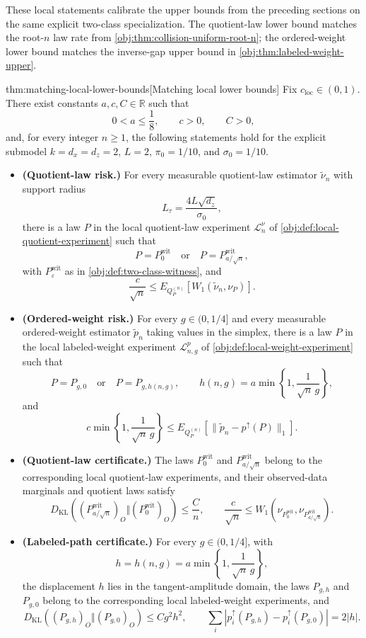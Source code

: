 \documentclass[11pt]{article}
\begin{document}
These local statements calibrate the upper bounds from the preceding sections on the same explicit two-class specialization. The quotient-law lower bound matches the root-\(n\) law rate from \cref{obj:thm:collision-uniform-root-n}; the ordered-weight lower bound matches the inverse-gap upper bound in \cref{obj:thm:labeled-weight-upper}.

\begin{theoremv}{thm:matching-local-lower-bounds}[Matching local lower bounds]
Fix \(c_{\mathrm{loc}}\in(0,1)\). There exist constants \(a,c,C\in\mathbb R\) such that
\[
0<a\le \frac18,\qquad c>0,\qquad C>0,
\]
and, for every integer \(n\ge 1\), the following statements hold for the explicit submodel \(k=d_x=d_z=2\), \(L=2\), \(\pi_0=1/10\), and \(\sigma_0=1/10\).
\begin{itemize}
\item \textbf{(Quotient-law risk.)} For every measurable quotient-law estimator \(\widetilde\nu_n\) with support radius
\[
L_\tau=\frac{4L\sqrt{d_z}}{\sigma_0},
\]
there is a law \(P\) in the local quotient-law experiment \(\mathcal L_n^\nu\) of \cref{obj:def:local-quotient-experiment} such that
\[
P=P_0^{\mathrm{wit}}
\quad\text{or}\quad
P=P_{a/\sqrt n}^{\mathrm{wit}},
\]
with \(P_\varepsilon^{\mathrm{wit}}\) as in \cref{obj:def:two-class-witness}, and
\[
\frac{c}{\sqrt n}
\le
E_{Q_P^{(n)}}\!\left[W_1(\widetilde\nu_n,\nu_P)\right].
\]

\item \textbf{(Ordered-weight risk.)} For every \(g\in(0,1/4]\) and every measurable ordered-weight estimator \(\widetilde p_n\) taking values in the simplex, there is a law \(P\) in the local labeled-weight experiment \(\mathcal L_{n,g}^{p}\) of \cref{obj:def:local-weight-experiment} such that
\[
P=P_{g,0}
\quad\text{or}\quad
P=P_{g,h(n,g)},
\qquad
h(n,g)=a\min\left\{1,\frac{1}{\sqrt n\,g}\right\},
\]
and
\[
c\min\left\{1,\frac{1}{\sqrt n\,g}\right\}
\le
E_{Q_P^{(n)}}\!\left[\|\widetilde p_n-p^{\uparrow}(P)\|_1\right].
\]

\item \textbf{(Quotient-law certificate.)} The laws \(P_0^{\mathrm{wit}}\) and \(P_{a/\sqrt n}^{\mathrm{wit}}\) belong to the corresponding local quotient-law experiments, and their observed-data marginals and quotient laws satisfy
\[
D_{\mathrm{KL}}\!\left((P_{a/\sqrt n}^{\mathrm{wit}})_O\Vert (P_0^{\mathrm{wit}})_O\right)
\le
\frac{C}{n},
\qquad
\frac{c}{\sqrt n}
\le
W_1\!\left(\nu_{P_0^{\mathrm{wit}}},\nu_{P_{a/\sqrt n}^{\mathrm{wit}}}\right).
\]

\item \textbf{(Labeled-path certificate.)} For every \(g\in(0,1/4]\), with
\[
h=h(n,g)=a\min\left\{1,\frac{1}{\sqrt n\,g}\right\},
\]
the displacement \(h\) lies in the tangent-amplitude domain, the laws \(P_{g,h}\) and \(P_{g,0}\) belong to the corresponding local labeled-weight experiments, and
\[
D_{\mathrm{KL}}\!\left((P_{g,h})_O\Vert (P_{g,0})_O\right)
\le
C g^2h^2,
\qquad
\sum_i\left|p_i^{\uparrow}(P_{g,h})-p_i^{\uparrow}(P_{g,0})\right|
=
2|h|.
\]
\end{itemize}
\end{theoremv}
\end{document}
